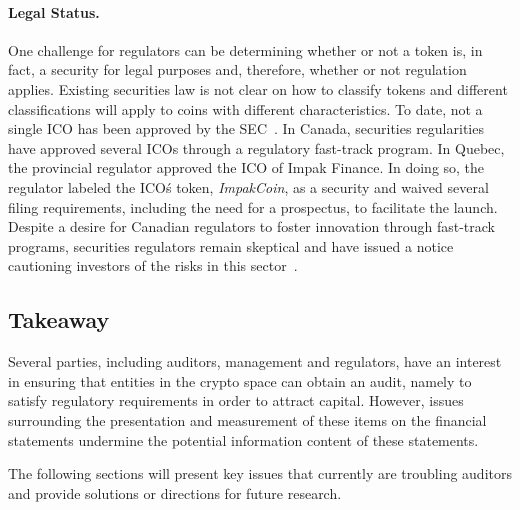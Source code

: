 \paragraph{Legal Status.} One challenge for regulators can be determining whether or not a token is, in fact, a security for legal purposes and, therefore, whether or not regulation applies. Existing securities law is not clear on how to classify tokens and different classifications will apply to coins with different characteristics. To date, not a single ICO has been approved by the SEC~\cite{SECICO2017}. In Canada, securities regularities have approved several ICOs through a regulatory fast-track program. In Quebec, the provincial regulator approved the ICO of Impak Finance. In doing so, the regulator labeled the ICO\'s token, \textit{ImpakCoin}, as a security and waived several filing requirements, including the need for a prospectus, to facilitate the launch. Despite a desire for Canadian regulators to foster innovation through fast-track programs, securities regulators remain skeptical and have issued a notice cautioning investors of the risks in this sector~\cite{CSAICO2017}. 

\subsection{Takeaway}
Several parties, including auditors, management and regulators, have an interest in ensuring that entities in the crypto space can obtain an audit, namely to satisfy regulatory requirements in order to attract capital. However, issues surrounding the presentation and measurement of these items on the financial statements undermine the potential information content of these statements. 

The following sections will present key issues that currently are troubling auditors and provide solutions or directions for future research. 

